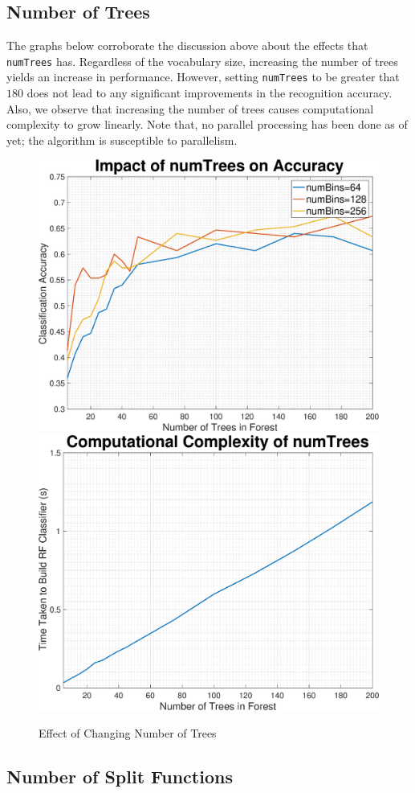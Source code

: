 \documentclass[a4paper,pra,twocolumn,10pt,aps,longbibliography,nobalancelastpage]{article}
\begin{document}
\subsection*{Number of Trees}

The graphs below corroborate the discussion above about the effects that \texttt{numTrees} has. Regardless of the vocabulary size, increasing the number of trees yields an increase in performance. However, setting  \texttt{numTrees} to be greater that $180$ does not lead to any significant improvements in the recognition accuracy. Also, we observe that increasing the number of trees causes computational complexity to grow linearly. Note that, no parallel processing has been done as of yet; the algorithm is susceptible to parallelism. 

\begin{figure}[H]
	\centering
    \includegraphics[width=0.49\columnwidth]{numTrees_acc}
	\includegraphics[width=0.49\columnwidth]{numTrees_complexity}
    \caption{Effect of Changing Number of Trees}
    \label{fig:numtrees_caltech}
\end{figure}

\subsection*{Number of Split Functions}
\end{document}
